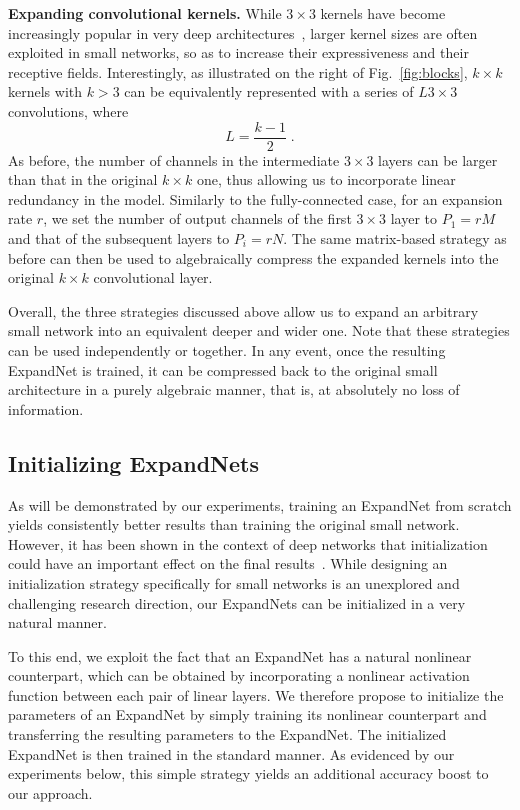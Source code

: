 \documentclass[10pt,twocolumn,letterpaper]{article}
\begin{document}
\vspace{0.2cm}\noindent\textbf{Expanding convolutional kernels.} 
While $3 \times 3$ kernels have become increasingly popular in very deep architectures~\cite{he2016deep}, larger kernel sizes are often exploited in small networks, so as to increase their expressiveness and their receptive fields. Interestingly, as illustrated on the right of Fig.~\ref{fig:blocks}, $k\times k$ kernels with $k>3$ can be equivalently represented with a series of $L$$3 \times 3$ convolutions, where
\begin{equation}
         L = \frac{k-1}{2}\;.
\end{equation}
As before, the number of channels in the intermediate $3 \times 3$ layers can be larger than that in the original $k \times k$ one, thus allowing us to incorporate linear redundancy in the model. Similarly to the fully-connected case, for an expansion rate $r$, we set the number of output channels of the first $3 \times 3$ layer to $P_1 = rM$ and that of the subsequent layers to $P_i = rN$.
The same matrix-based strategy as before can then be used to algebraically compress the expanded kernels into the original $k \times k$ convolutional layer.

Overall, the three strategies discussed above allow us to expand an arbitrary small network into an equivalent deeper and wider one. Note that these strategies can be used independently or together. In any event, once the resulting ExpandNet is trained, it can be compressed back to the original small architecture in a purely algebraic manner, that is, at absolutely no loss of information.

\subsection{Initializing ExpandNets}
As will be demonstrated by our experiments, training an ExpandNet from scratch yields consistently better results than training the original small network. However, it has been shown in the context of deep networks that initialization could have an important effect on the final results~\cite{Mishkin2015AllYN, He:2015}. While designing an initialization strategy specifically for small networks is an unexplored and challenging research direction, our ExpandNets can be initialized in a very natural manner.

To this end, we exploit the fact that an ExpandNet has a natural nonlinear counterpart, which can be obtained by incorporating a nonlinear activation function between each pair of linear layers. We therefore propose to initialize the parameters of an ExpandNet by simply training its nonlinear counterpart and transferring the resulting parameters to the ExpandNet. The initialized ExpandNet is then trained in the standard manner. As evidenced by our experiments below, this simple strategy yields an additional accuracy boost to our approach.
\end{document}
